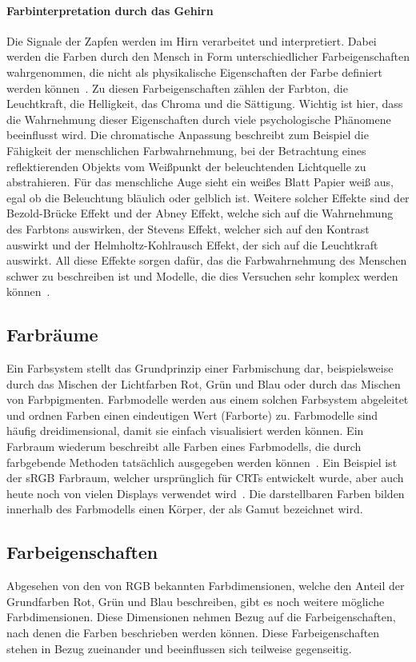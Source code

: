 \documentclass[12pt, a4paper, ngerman]{article}
\begin{document}
\paragraph{Farbinterpretation durch das Gehirn}
Die Signale der Zapfen werden im Hirn verarbeitet und interpretiert. 
Dabei werden die Farben durch den Mensch in Form unterschiedlicher Farbeigenschaften wahrgenommen, 
die nicht als physikalische Eigenschaften der Farbe definiert werden können~\cite{Ottosson_2020}.
Zu diesen Farbeigenschaften zählen der Farbton, die Leuchtkraft, die Helligkeit, das Chroma und die Sättigung.
Wichtig ist hier, dass die Wahrnehmung dieser Eigenschaften durch viele psychologische Phänomene beeinflusst wird.
Die chromatische Anpassung beschreibt zum Beispiel die Fähigkeit der menschlichen Farbwahrnehmung, 
bei der Betrachtung eines reflektierenden Objekts vom Weißpunkt der beleuchtenden Lichtquelle zu abstrahieren. 
Für das menschliche Auge sieht ein weißes Blatt Papier weiß aus, egal ob die Beleuchtung bläulich oder gelblich ist.
Weitere solcher Effekte sind der Bezold-Brücke Effekt und der Abney Effekt, welche sich auf die Wahrnehmung des Farbtons auswirken,
der Stevens Effekt, welcher sich auf den Kontrast auswirkt und der Helmholtz-Kohlrausch Effekt, der sich auf die Leuchtkraft auswirkt.
All diese Effekte sorgen dafür, das die Farbwahrnehmung des Menschen schwer zu beschreiben ist und Modelle, die dies Versuchen sehr komplex werden können~\cite{Color_appearance_model_2023}.

\subsection{Farbräume}
Ein Farbsystem stellt das Grundprinzip einer Farbmischung dar, 
beispielsweise durch das Mischen der Lichtfarben Rot, Grün und Blau oder durch das Mischen von Farbpigmenten.
Farbmodelle werden aus einem solchen Farbsystem abgeleitet und ordnen Farben einen eindeutigen Wert (Farborte) zu.
Farbmodelle sind häufig dreidimensional, damit sie einfach visualisiert werden können.
Ein Farbraum wiederum beschreibt alle Farben eines Farbmodells, die durch farbgebende Methoden tatsächlich ausgegeben werden können~\cite{Farbraum_2023}.
Ein Beispiel ist der \acs{sRGB} Farbraum, welcher ursprünglich für \acs{CRT}s entwickelt wurde, aber auch heute noch von vielen Displays verwendet wird~\cite{sRGB-Farbraum_2019}.
Die darstellbaren Farben bilden innerhalb des Farbmodells einen Körper, der als Gamut bezeichnet wird.

\subsection{Farbeigenschaften} 
Abgesehen von den von \acs{RGB} bekannten Farbdimensionen, welche den Anteil der Grundfarben Rot, Grün und Blau beschreiben, 
gibt es noch weitere mögliche Farbdimensionen. Diese Dimensionen nehmen Bezug auf die Farbeigenschaften, nach denen die Farben beschrieben werden können.
Diese Farbeigenschaften stehen in Bezug zueinander und beeinflussen sich teilweise gegenseitig.
\end{document}
